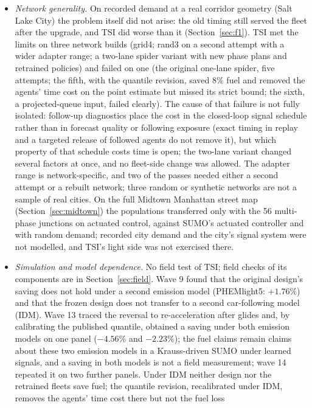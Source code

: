 \begin{itemize}\setlength\itemsep{1pt}
\item \emph{Network generality.} On recorded demand at a real corridor geometry (Salt Lake City) the problem itself did not arise: the old
timing still served the fleet after the upgrade, and TSI did worse than it (Section~\ref{sec:f1}). TSI met the limits on three network builds (grid4; rand3 on a second attempt with a wider adapter range;
a two-lane spider variant with new phase plans and retrained policies) and failed on one (the original one-lane spider, five attempts;
the fifth, with the quantile revision, saved $8\%$ fuel and removed the agents' time cost on the point estimate but missed its strict bound;
the sixth, a projected-queue input, failed clearly).
The cause of that failure is not fully isolated: follow-up diagnostics place the cost in the closed-loop signal schedule rather than in
forecast quality or following exposure (exact timing in replay and a targeted release of followed agents do not remove it), but which
property of that schedule costs time is open; the two-lane variant changed several factors at once, and no fleet-side change was allowed. The
adapter range is network-specific, and two of the passes needed either a second attempt or a rebuilt network; three random or synthetic
networks are not a sample of real cities. On the full Midtown Manhattan street map (Section~\ref{sec:midtown}) the populations
transferred only with the 56 multi-phase junctions on actuated control, against SUMO's actuated controller and with random demand;
recorded city demand and the city's signal system were not modelled, and TSI's light side was not exercised there.
\item \emph{Simulation and model dependence.} No field test of TSI; field checks of its components are in Section~\ref{sec:field}. Wave 9 found that the original design's saving does not hold under a second
emission model (PHEMlight5: $+1.76\%$) and that the frozen design does not transfer to a second car-following model (IDM). Wave 13 traced
the reversal to re-acceleration after glides and, by calibrating the published quantile, obtained a saving under both emission models on
one panel ($-4.56\%$ and $-2.23\%$); the fuel claims remain claims about these two emission models in a Krauss-driven SUMO under learned
signals, and a saving in both models is not a field measurement; wave 14 repeated it on two further panels. Under IDM neither design nor
the retrained fleets save fuel; the quantile revision, recalibrated under IDM, removes the agents' time cost there but not the fuel loss

\end{itemize}
